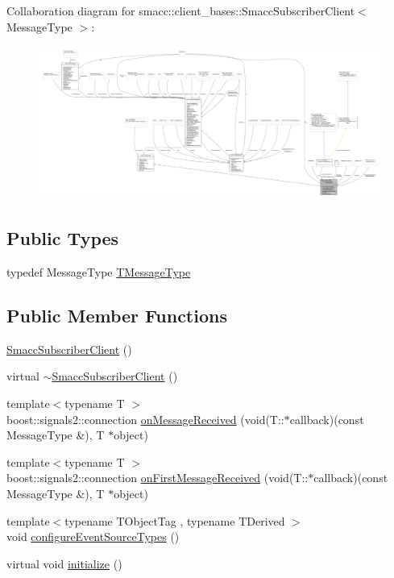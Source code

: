 Collaboration diagram for smacc\+:\+:client\+\_\+bases\+:\+:Smacc\+Subscriber\+Client$<$ Message\+Type $>$\+:\nopagebreak
\begin{figure}[H]
\begin{center}
\leavevmode
\includegraphics[width=350pt]{classsmacc_1_1client__bases_1_1SmaccSubscriberClient__coll__graph}
\end{center}
\end{figure}
\subsection*{Public Types}
\begin{DoxyCompactItemize}
\item 
typedef Message\+Type \hyperlink{classsmacc_1_1client__bases_1_1SmaccSubscriberClient_a61d798bda71bf335d72e61928ca561b0}{T\+Message\+Type}
\end{DoxyCompactItemize}
\subsection*{Public Member Functions}
\begin{DoxyCompactItemize}
\item 
\hyperlink{classsmacc_1_1client__bases_1_1SmaccSubscriberClient_a9c3dd9981beb495a0646667acae06d73}{Smacc\+Subscriber\+Client} ()
\item 
virtual \hyperlink{classsmacc_1_1client__bases_1_1SmaccSubscriberClient_a91b9206c97b4acc76d4202639d24a53b}{$\sim$\+Smacc\+Subscriber\+Client} ()
\item 
{\footnotesize template$<$typename T $>$ }\\boost\+::signals2\+::connection \hyperlink{classsmacc_1_1client__bases_1_1SmaccSubscriberClient_a4f02251e3a161fb6d802b154b1081f18}{on\+Message\+Received} (void(T\+::$\ast$callback)(const Message\+Type \&), T $\ast$object)
\item 
{\footnotesize template$<$typename T $>$ }\\boost\+::signals2\+::connection \hyperlink{classsmacc_1_1client__bases_1_1SmaccSubscriberClient_a3f6dc8ef86f21f401204182778cc584d}{on\+First\+Message\+Received} (void(T\+::$\ast$callback)(const Message\+Type \&), T $\ast$object)
\item 
{\footnotesize template$<$typename T\+Object\+Tag , typename T\+Derived $>$ }\\void \hyperlink{classsmacc_1_1client__bases_1_1SmaccSubscriberClient_adf0e61d4a0b34ecc76fb9f4c3d04ef97}{configure\+Event\+Source\+Types} ()
\item 
virtual void \hyperlink{classsmacc_1_1client__bases_1_1SmaccSubscriberClient_af188f0f5e89de26a07e1f964cdd23a70}{initialize} ()
\end{DoxyCompactItemize}
